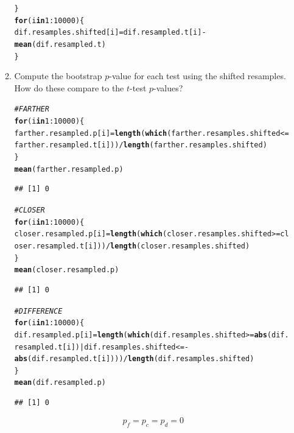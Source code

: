 \documentclass{article}\usepackage[]{graphicx}\usepackage[]{xcolor}
\makeatletter
\newcommand{\hlnum}[1]{\textcolor[rgb]{0.686,0.059,0.569}{#1}}%
\newcommand{\hlcom}[1]{\textcolor[rgb]{0.678,0.584,0.686}{\textit{#1}}}%
\newcommand{\hlopt}[1]{\textcolor[rgb]{0,0,0}{#1}}%
\newcommand{\hldef}[1]{\textcolor[rgb]{0.345,0.345,0.345}{#1}}%
\newcommand{\hlkwa}[1]{\textcolor[rgb]{0.161,0.373,0.58}{\textbf{#1}}}%
\newcommand{\hlkwb}[1]{\textcolor[rgb]{0.69,0.353,0.396}{#1}}%
\newcommand{\hlkwd}[1]{\textcolor[rgb]{0.737,0.353,0.396}{\textbf{#1}}}%
\newenvironment{kframe}{%
 \def\at@end@of@kframe{}%
 \ifinner\ifhmode%
  \def\at@end@of@kframe{\end{minipage}}%
  \begin{minipage}{\columnwidth}%
 \fi\fi%
 \def\FrameCommand##1{\hskip\@totalleftmargin \hskip-\fboxsep
 \colorbox{shadecolor}{##1}\hskip-\fboxsep
     \hskip-\linewidth \hskip-\@totalleftmargin \hskip\columnwidth}%
 \MakeFramed {\advance\hsize-\width
   \@totalleftmargin\z@ \linewidth\hsize
   \@setminipage}}%
 {\par\unskip\endMakeFramed%
 \at@end@of@kframe}
\newenvironment{knitrout}{}{} %
\makeatother
\begin{document}
\begin{enumerate}
\begin{enumerate}
\begin{knitrout}
\begin{kframe}
\begin{alltt}
\hldef{\}}
\hlkwa{for}\hldef{(i} \hlkwa{in} \hlnum{1}\hlopt{:}\hlnum{10000}\hldef{)\{}
\hldef{dif.resamples.shifted[i]} \hlkwb{=} \hldef{dif.resampled.t[i]} \hlopt{-} \hlkwd{mean}\hldef{(dif.resampled.t)}
\hldef{\}}
\end{alltt}
\end{kframe}
\end{knitrout}
  \item Compute the bootstrap $p$-value for each test using the shifted resamples. 
  How do these compare to the $t$-test $p$-values?
\begin{knitrout}\scriptsize
{}\color{fgcolor}\begin{kframe}
\begin{alltt}
\hlcom{#FARTHER}
\hlkwa{for}\hldef{(i} \hlkwa{in} \hlnum{1}\hlopt{:}\hlnum{10000}\hldef{)\{}
\hldef{farther.resampled.p[i]} \hlkwb{=} \hlkwd{length}\hldef{(}\hlkwd{which}\hldef{(farther.resamples.shifted} \hlopt{<=} \hldef{farther.resampled.t[i]))}\hlopt{/}\hlkwd{length}\hldef{(farther.resamples.shifted)}
\hldef{\}}
\hlkwd{mean}\hldef{(farther.resampled.p)}
\end{alltt}
\begin{verbatim}
## [1] 0
\end{verbatim}
\begin{alltt}
\hlcom{#CLOSER}
\hlkwa{for}\hldef{(i} \hlkwa{in} \hlnum{1}\hlopt{:}\hlnum{10000}\hldef{)\{}
\hldef{closer.resampled.p[i]} \hlkwb{=} \hlkwd{length}\hldef{(}\hlkwd{which}\hldef{(closer.resamples.shifted} \hlopt{>=} \hldef{closer.resampled.t[i]))}\hlopt{/}\hlkwd{length}\hldef{(closer.resamples.shifted)}
\hldef{\}}
\hlkwd{mean}\hldef{(closer.resampled.p)}
\end{alltt}
\begin{verbatim}
## [1] 0
\end{verbatim}
\begin{alltt}
\hlcom{#DIFFERENCE}
\hlkwa{for}\hldef{(i} \hlkwa{in} \hlnum{1}\hlopt{:}\hlnum{10000}\hldef{)\{}
\hldef{dif.resampled.p[i]} \hlkwb{=} \hlkwd{length}\hldef{(}\hlkwd{which}\hldef{(dif.resamples.shifted} \hlopt{>=} \hlkwd{abs}\hldef{(dif.resampled.t[i])} \hlopt{|} \hldef{dif.resamples.shifted} \hlopt{<= -}\hlkwd{abs}\hldef{(dif.resampled.t[i])))}\hlopt{/}\hlkwd{length}\hldef{(dif.resamples.shifted)}
\hldef{\}}
\hlkwd{mean}\hldef{(dif.resampled.p)}
\end{alltt}
\begin{verbatim}
## [1] 0
\end{verbatim}
\end{kframe}
\end{knitrout}
\[p_f = p_c = p_d = 0\]


\end{enumerate}
\end{enumerate}
\end{document}
